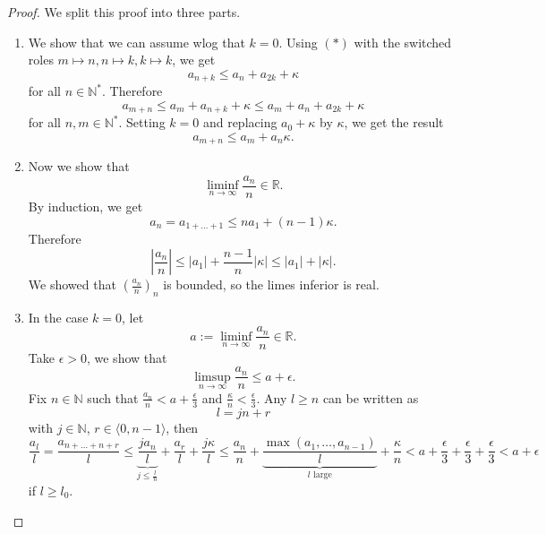 \documentclass{article}
\newcommand*{\N}{\mathbb{N}}
\newcommand*{\R}{\mathbb{R}}
\newcommand*{\Ns}{\N^*}
\newcommand*{\jbr}[1]{{\langle #1 \rangle}}
\begin{document}
\begin{proof}
    We split this proof into three parts.
    \begin{enumerate}
        \item We show that we can assume wlog that $k=0$. Using $(*)$ with the switched roles $m \mapsto n, n\mapsto k, k \mapsto k$, we get
        $$a_{n+k}\leq a_n+a_{2k}+\kappa $$
        for all $n\in\Ns$. Therefore
        $$a_{m+n}\leq a_m+a_{n+k}+\kappa \leq a_m+a_n+a_{2k}+\kappa$$
        for all $n,m\in\Ns$. Setting $k=0$ and replacing $a_0+\kappa$ by $\kappa$, we get the result
        $$a_{m+n} \leq a_m+a_n\kappa.$$

        \item Now we show that
        $$\liminf_{n\to\infty}\frac{a_n}n\in\R.$$
        By induction, we get
        $$a_n = a_{1+\dots+1} \leq na_1+(n-1)\kappa.$$
        Therefore
        $$\left|\frac{a_n}{n}\right| \leq |a_1|+\frac{n-1}{n}|\kappa| \leq |a_1|+|\kappa|.$$
        We showed that $\left(\frac{a_n}{n}\right)_n$ is bounded, so the limes inferior is real.

        \item In the case $k=0$, let
        $$a:=\liminf_{n\to\infty}\frac{a_n}n\in\R.$$
        Take $\epsilon > 0$, we show that
        $$\limsup_{n\to\infty}\frac{a_n}n\leq a+\epsilon.$$
        Fix $n\in\N$ such that $\frac{a_n}n < a+\frac\epsilon3$ and $\frac\kappa n<\frac\epsilon3$. Any $l\geq n$ can be written as
        $$l=jn+r$$
        with $j\in\N$, $r\in\jbr{0,n-1}$, then
        $$\frac{a_l}l=\frac{a_{n+\dots+n+r}}l\leq\underbrace{\frac{ja_n}l}_{j \leq \frac ln}+\frac{a_r}l+\frac{j\kappa}l\leq\frac{a_n}n+\underbrace{\frac{\max(a_1,\dots,a_{n-1})}l}_{l \text{ large}}+\frac\kappa n < a+\frac{\epsilon}{3}+\frac{\epsilon}3+\frac\epsilon3<a+\epsilon$$
        if $l \geq l_0$.
    \end{enumerate}
\end{proof}
\end{document}
